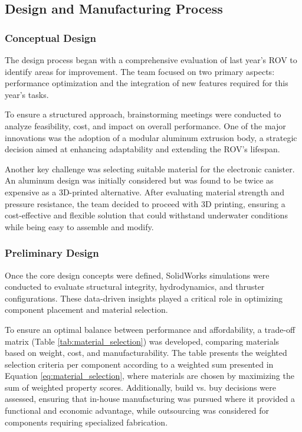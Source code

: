 \subsection{Design and Manufacturing Process}

\subsubsection{Conceptual Design}

The design process began with a comprehensive evaluation of last year’s ROV to identify areas for improvement. The team focused on two primary aspects: performance optimization and the integration of new features required for this year’s tasks.

\hspace{10pt} To ensure a structured approach, brainstorming meetings were conducted to analyze feasibility, cost, and impact on overall performance. One of the major innovations was the adoption of a modular aluminum extrusion body, a strategic decision aimed at enhancing adaptability and extending the ROV’s lifespan. 

\hspace{10pt} Another key challenge was selecting suitable material for the electronic canister. An aluminum design was initially considered but was found to be twice as expensive as a 3D-printed alternative. After evaluating material strength and pressure resistance, the team decided to proceed with 3D printing, ensuring a cost-effective and flexible solution that could withstand underwater conditions while being easy to assemble and modify.

\subsubsection{Preliminary Design}

Once the core design concepts were defined, SolidWorks simulations were conducted to evaluate structural integrity, hydrodynamics, and thruster configurations. These data-driven insights played a critical role in optimizing component placement and material selection.

\hspace{10pt} To ensure an optimal balance between performance and affordability, a trade-off matrix (Table \ref{tab:material_selection}) was developed, comparing materials based on weight, cost, and manufacturability. The table presents the weighted selection criteria per component according to  a weighted sum presented in Equation \ref{eq:material_selection}, where materials are chosen by maximizing the sum of weighted property scores. Additionally, build vs. buy decisions were assessed, ensuring that in-house manufacturing was pursued where it provided a functional and economic advantage, while outsourcing was considered for components requiring specialized fabrication.

